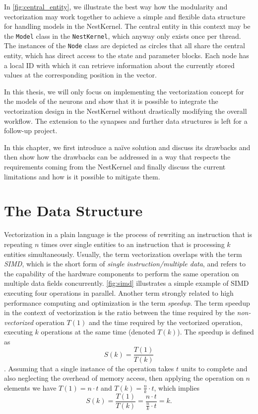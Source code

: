 In \autoref{fig:central_entity}, we illustrate the best way how the modularity and vectorization may work together to achieve a simple and flexible data structure for handling models in the NestKernel. The central entity in this context may be the \texttt{Model} class in the \texttt{NestKernel}, which anyway only exists once per thread. The instances of the \texttt{Node} class are depicted as circles that all share the central entity, which has direct access to the state and parameter blocks. Each node has a local ID with which it can retrieve information about the currently stored values at the corresponding position in the vector.
 
In this thesis, we will only focus on implementing the vectorization concept for the models of the neurons and show that it is possible to integrate the vectorization design in the NestKernel without drastically modifying the overall workflow. The extension to the synapses and further data structures is left for a follow-up project.

In this chapter, we first introduce a naïve solution and discuss its drawbacks and then show how the drawbacks can be addressed in a way that respects the requirements coming from the NestKernel and finally discuss the current limitations and how is it possible to mitigate them.

\section{The Data Structure}

Vectorization in a plain language is the process of rewriting an instruction that is repeating $n$ times over single entities to an instruction that is processing $k$ entities simultaneously. Usually, the term vectorization overlaps with the term \emph{SIMD}, which is the short form of \emph{single instruction/multiple data}, and refers to the capability of the hardware components to perform the same operation on multiple data fields concurrently. \autoref{fig:simd} illustrates a simple example of SIMD executing four operations in parallel. Another term strongly related to high performance computing and optimization is the term \emph{speedup}. The term speedup in the context of vectorization is the ratio between the time required by the \emph{non-vectorized} operation $T(1)$ and the time required by the vectorized operation, executing $k$ operations at the same time (denoted $T(k)$). The speedup is defined as $$S(k) = \frac{T(1)}{T(k)}$$. Assuming that a single instance of the operation takes $t$ units to complete and also neglecting the overhead of memory access, then applying the operation on $n$ elements we have $T(1) = n \cdot t$ and $T(k) = \frac{n}{k} \cdot t$, which implies $$S(k) = \frac{T(1)}{T(k)} = \frac{n \cdot t}{\frac{n}{k} \cdot t} = k.$$

